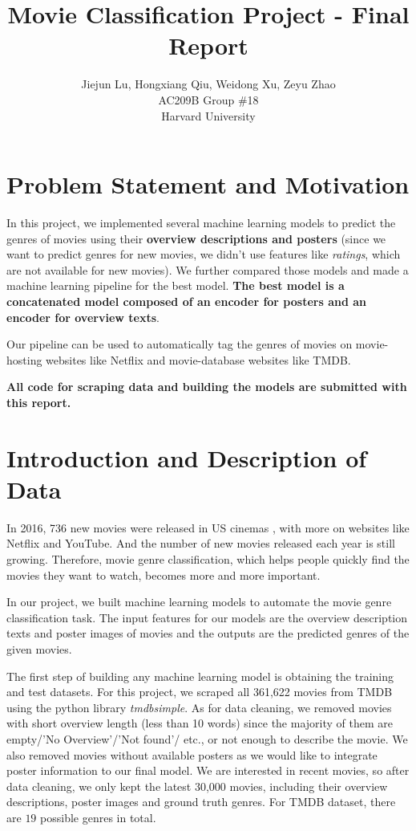 \documentclass[12pt]{article} %
\title{Movie Classification Project - Final Report}
\author{
Jiejun Lu, Hongxiang Qiu, Weidong Xu, Zeyu Zhao\\
AC209B Group \#18\\
Harvard University\\
}
\begin{document}
\maketitle

\section{Problem Statement and Motivation}

In this project, we implemented several machine learning models to predict the genres of movies using their {\bf overview descriptions and posters} (since we want to predict genres for new movies, we didn't use features like {\it ratings}, which are not available for new movies). We further compared those models and made a machine learning pipeline for the best model. {\bf The best model is a concatenated model composed of an encoder for posters and an encoder for overview texts}.

Our pipeline can be used to automatically tag the genres of movies on movie-hosting websites like Netflix and movie-database websites like TMDB.

{\bf All code for scraping data and building the models are submitted with this report.}

\section{Introduction and Description of Data}

In 2016, 736 new movies were released in US cinemas \cite{web_movie_num}, with more on websites like Netflix and YouTube. And the number of new movies released each year is still growing. Therefore, movie genre classification, which helps people quickly find the movies they want to watch, becomes more and more important.

In our project, we built machine learning models to automate the movie genre classification task. The input features for our models are the overview description texts and poster images of movies and the outputs are the predicted genres of the given movies.

The first step of building any machine learning model is obtaining the training and test datasets. For this project, we scraped all 361,622 movies from TMDB using the python library {\it tmdbsimple}. As for data cleaning, we removed movies with short overview length (less than 10 words) since the majority of them are empty/'No Overview'/'Not found'/ etc., or not enough to describe the movie. We also removed movies without available posters as we would like to integrate poster information to our final model. We are interested in recent movies, so after data cleaning, we only kept the latest 30,000 movies, including their overview descriptions, poster images and ground truth genres. For TMDB dataset, there are $19$ possible genres in total.
\end{document}
